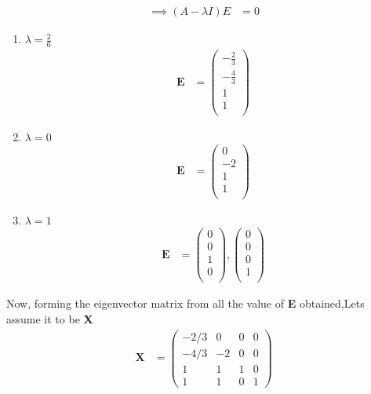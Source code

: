 \documentclass[journal,12pt,onecolumn]{IEEEtran}
\begin{document}
\begin{align}
\implies (A - \lambda I)E &= 0
\end{align}
\begin{enumerate}
\item $\lambda = \frac{2}{6}$
\begin{align}
\mathbf{E} &= 
\begin{pmatrix}
-\frac{2}{3} \\[4pt]
-\frac{4}{3}\\[4pt]
1\\[4pt]
1\\[4pt]
\end{pmatrix}
\end{align}
\item $\lambda = 0$
\begin{align}
\mathbf{E} &= 
\begin{pmatrix}
0 \\[4pt]
-2\\[4pt]
1\\[4pt]
1\\[4pt]
\end{pmatrix}
\end{align}
\item $\lambda = 1$
\begin{align}
\mathbf{E} &= 
\begin{pmatrix}
0 \\[4pt]
0\\[4pt]
1\\[4pt]
0\\[4pt]
\end{pmatrix}
,
\begin{pmatrix}
0 \\[4pt]
0\\[4pt]
0\\[4pt]
1\\[4pt]
\end{pmatrix}
\end{align}
\end{enumerate}
Now, forming the eigenvector matrix from all the value of \textbf{E} obtained,Lets assume it to be \textbf{X}\\
\begin{align}
\mathbf{X} &=
\begin{pmatrix}
-2/3 & 0 & 0 & 0\\
-4/3 & -2 & 0 & 0\\
1 & 1 & 1 & 0\\
1 & 1 & 0 & 1
\end{pmatrix}
\end{align}
\end{document}
